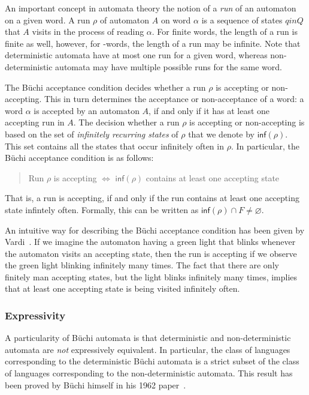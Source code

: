 An important concept in automata theory the notion of a \textit{run} of an automaton on a given word. A run $\rho$ of automaton $A$ on word $\alpha$ is a sequence of states $q in Q$ that $A$ visits in the process of reading $\alpha$. For finite words, the length of a run is finite as well, however, for \om-words, the length of a run may be infinite. Note that deterministic automata have at most one run for a given word, whereas non-deterministic automata may have multiple possible runs for the same word.

The Büchi acceptance condition decides whether a run $\rho$ is accepting or non-accepting. This in turn determines the acceptance or non-acceptance of a word: a word $\alpha$ is accepted by an automaton $A$, if and only if it has at least one accepting run in $A$. The decision whether a run $\rho$ is accepting or non-accepting is based on the set of \textit{infinitely recurring states} of $\rho$ that we denote by $\textsf{inf}(\rho)$. This set contains all the states that occur infinitely often in $\rho$. In particular, the Büchi acceptance condition is as follows:

\begin{quote}
\centering
Run $\rho$ is accepting $\Longleftrightarrow$ $\textsf{inf}(\rho)$ contains at least one accepting state
\end{quote}

That is, a run is accepting, if and only if the run contains at least one accepting state infintely often. Formally, this can be written as $\textsf{inf}(\rho) \cap F \neq \varnothing$. 

An intuitive way for describing the Büchi acceptance condition has been given by Vardi~\cite{1996_vardi}. If we imagine the automaton having a green light that blinks whenever the automaton visits an accepting state, then the run is accepting if we observe the green light blinking infinitely many times. The fact that there are only finitely man accepting states, but the light blinks infinitely many times, implies that at least one accepting state is being visited infinitely often.

\subsubsection{Expressivity}
A particularity of Büchi automata is that deterministic and non-deterministic automata are \textit{not} expressively equivalent. In particular, the class of languages corresponding to the deterministic Büchi automata is a strict subset of the class of languages corresponding to the non-deterministic automata. This result has been proved by Büchi himself in his 1962 paper~\cite{buchi1960decision}.

